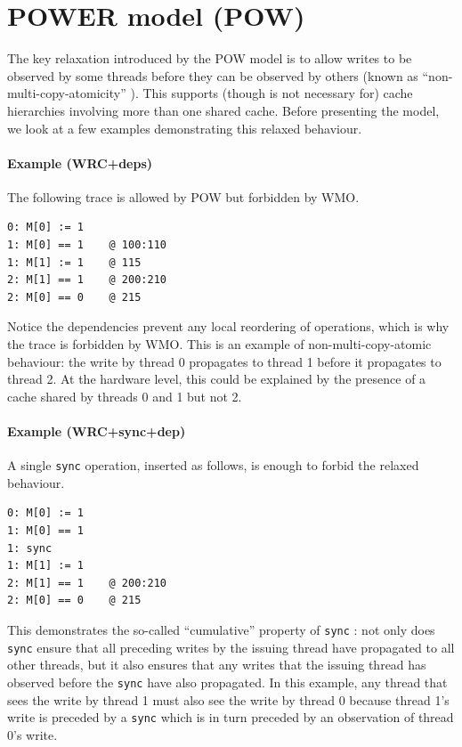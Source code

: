 \documentclass[11pt]{article}
\begin{document}
\section{POWER model (POW)}
\label{Section:POWERModel}

The key relaxation introduced by the POW model is to allow writes to
be observed by some threads before they can be observed by others
(known as ``non-multi-copy-atomicity'' \cite{POWER}).  This supports
(though is not necessary for) cache hierarchies involving more than
one shared cache.  Before presenting the model, we look at a few
examples demonstrating this relaxed behaviour.

\paragraph{Example (WRC+deps)}  The following trace is allowed by POW
but forbidden by WMO.

\begin{verbatim}
0: M[0] := 1
1: M[0] == 1    @ 100:110
1: M[1] := 1    @ 115
2: M[1] == 1    @ 200:210
2: M[0] == 0    @ 215
\end{verbatim}

\noindent Notice the dependencies prevent any local reordering of
operations, which is why the trace is forbidden by WMO.  This is an
example of non-multi-copy-atomic behaviour: the write by thread 0
propagates to thread 1 before it propagates to thread 2.  At the
hardware level, this could be explained by the presence of a cache
shared by threads 0 and 1 but not 2.

\paragraph{Example (WRC+sync+dep)} A single \verb'sync' operation,
inserted as follows, is enough to forbid the relaxed behaviour.

\begin{verbatim}
0: M[0] := 1
1: M[0] == 1
1: sync
1: M[1] := 1
2: M[1] == 1    @ 200:210
2: M[0] == 0    @ 215
\end{verbatim}

\noindent This demonstrates the so-called ``cumulative'' property of
\verb!sync! \cite{POWER}: not only does \verb!sync! ensure that all
preceding writes by the issuing thread have propagated to all other
threads, but it also ensures that any writes that the issuing thread
has observed before the \verb!sync! have also propagated.  In this
example, any thread that sees the write by thread 1 must also see the
write by thread 0 because thread 1's write is preceded by a
\verb'sync' which is in turn preceded by an observation of thread 0's
write.
\end{document}
